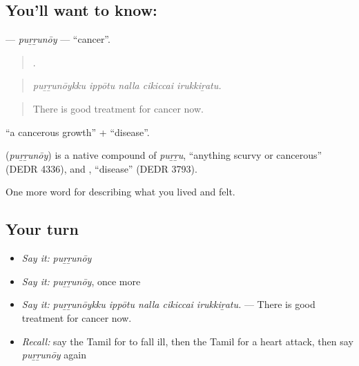 \subsection*{You'll want to know: }
\textbf{} — \emph{puṟṟunōy} — \textquotedblleft{}cancer\textquotedblright{}.

\begin{quote}
    .
\end{quote}

\begin{quote}
\emph{puṟṟunōykku ippōtu nalla cikiccai irukkiṟatu.}
\end{quote}

\begin{quote}
There is good treatment for cancer now.
\end{quote}

 \textquotedblleft{}a cancerous growth\textquotedblright{} +  \textquotedblleft{}disease\textquotedblright{}.

\begin{cousinweb}
\textbf{} (\emph{puṟṟunōy}) is a native compound of  \emph{puṟṟu}, \textquotedblleft{}anything scurvy or cancerous\textquotedblright{} (DEDR 4336), and , \textquotedblleft{}disease\textquotedblright{} (DEDR 3793).
\end{cousinweb}

\begin{grammarlens}[title={What you've built}]
One more word for describing what you lived and felt.
\end{grammarlens}

\subsection*{Your turn}
\begin{itemize}
\raggedright
  \item \emph{Say it:} \emph{puṟṟunōy}
  \item \emph{Say it:} \emph{puṟṟunōy}, once more
  \item \emph{Say it:} \emph{puṟṟunōykku ippōtu nalla cikiccai irukkiṟatu.} — There is good treatment for cancer now.
  \item \emph{Recall:} say the Tamil for to fall ill, then the Tamil for a heart attack, then say \emph{puṟṟunōy} again
\end{itemize}

